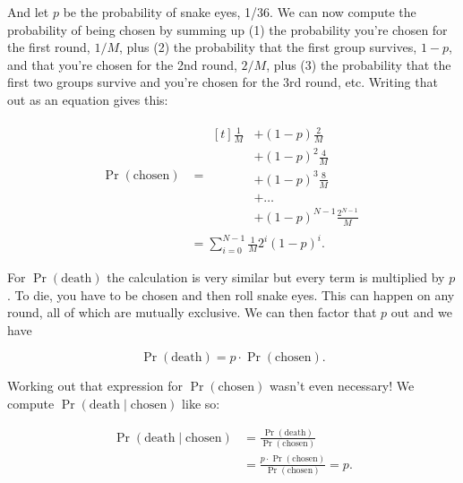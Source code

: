 \documentclass[article,twocolumn]{memoir}
\begin{document}
And let $p$ be the probability of snake eyes, 1/36.
We can now compute the probability of being chosen by summing up 
(1) the probability you're chosen for the first round, $1/M$, plus 
(2) the probability that the first group survives, $1-p$, and that you're chosen for the 2nd round, $2/M$, plus 
(3) the probability that the first two groups survive and you're chosen for the 3rd round, etc.
Writing that out as an equation gives this:

\begin{align*}
\Pr(\text{chosen}) & = 
\begin{aligned}[t]
\tfrac{1}{M} & + (1-p)\tfrac{2}{M} \\
& + (1-p)^2\tfrac{4}{M} \\
& + (1-p)^3\tfrac{8}{M} \\
& + \ldots \\
& + (1-p)^{N-1}\frac{2^{N-1}}{M}
\end{aligned} \\
& = \sum_{i=0}^{N-1} \tfrac{1}{M} 2^i(1-p)^i.
\end{align*}

For $\Pr(\text{death})$ the calculation is very similar but every term is multiplied by $p$.
To die, you have to be chosen and then roll snake eyes.
This can happen on any round, all of which are mutually exclusive.
We can then factor that $p$ out and we have

$$
\Pr(\text{death}) = p\cdot\Pr(\text{chosen}).
$$

Working out that expression for $\Pr(\text{chosen})$ wasn't even necessary!
We compute $\Pr(\text{death} \mid \text{chosen})$ like so:

\begin{equation*}
\begin{split}
\Pr(\text{death} \mid \text{chosen}) & = 
\frac{\Pr(\text{death})}{\Pr(\text{chosen})} \\
& = \frac{p\cdot\Pr(\text{chosen})}{\Pr(\text{chosen})} = 
p.
\end{split}
\end{equation*}
\end{document}
